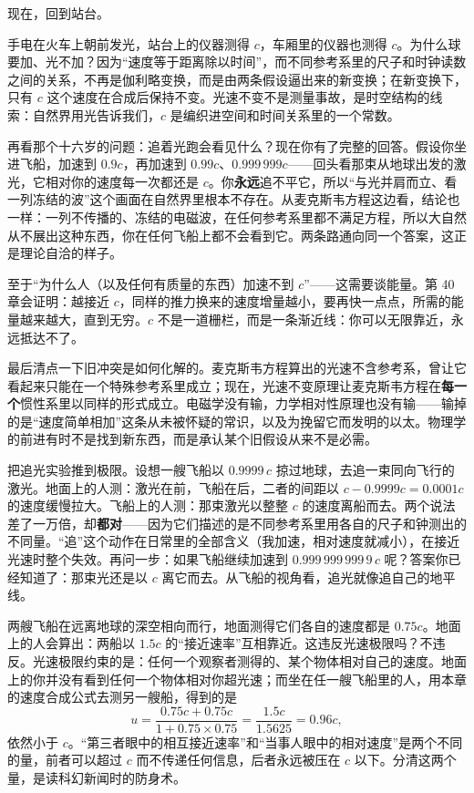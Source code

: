 
现在，回到站台。

手电在火车上朝前发光，站台上的仪器测得 \(c\)，车厢里的仪器也测得 \(c\)。为什么球要加、光不加？因为“速度等于距离除以时间”，而不同参考系里的尺子和时钟读数之间的关系，不再是伽利略变换，而是由两条假设逼出来的新变换；在新变换下，只有 \(c\) 这个速度在合成后保持不变。光速不变不是测量事故，是时空结构的线索：自然界用光告诉我们，\(c\) 是编织进空间和时间关系里的一个常数。

再看那个十六岁的问题：追着光跑会看见什么？现在你有了完整的回答。假设你坐进飞船，加速到 \(0.9c\)，再加速到 \(0.99c\)、\(0.999\,999c\)——回头看那束从地球出发的激光，它相对你的速度每一次都还是 \(c\)。你\textbf{永远}追不平它，所以“与光并肩而立、看一列冻结的波”这个画面在自然界里根本不存在。从麦克斯韦方程这边看，结论也一样：一列不传播的、冻结的电磁波，在任何参考系里都不满足方程，所以大自然从不展出这种东西，你在任何飞船上都不会看到它。两条路通向同一个答案，这正是理论自洽的样子。

至于“为什么人（以及任何有质量的东西）加速不到 \(c\)”——这需要谈能量。第 40 章会证明：越接近 \(c\)，同样的推力换来的速度增量越小，要再快一点点，所需的能量越来越大，直到无穷。\(c\) 不是一道栅栏，而是一条渐近线：你可以无限靠近，永远抵达不了。

最后清点一下旧冲突是如何化解的。麦克斯韦方程算出的光速不含参考系，曾让它看起来只能在一个特殊参考系里成立；现在，光速不变原理让麦克斯韦方程在\textbf{每一个}惯性系里以同样的形式成立。电磁学没有输，力学相对性原理也没有输——输掉的是“速度简单相加”这条从未被怀疑的常识，以及为挽留它而发明的以太。物理学的前进有时不是找到新东西，而是承认某个旧假设从来不是必需。


\begin{thought}[星系尺度的追光]
把追光实验推到极限。设想一艘飞船以 \(0.9999\,c\) 掠过地球，去追一束同向飞行的激光。地面上的人测：激光在前，飞船在后，二者的间距以 \(c-0.9999c=0.0001c\) 的速度缓慢拉大。飞船上的人测：那束激光以整整 \(c\) 的速度离船而去。两个说法差了一万倍，却\textbf{都对}——因为它们描述的是不同参考系里用各自的尺子和钟测出的不同量。“追”这个动作在日常里的全部含义（我加速，相对速度就减小），在接近光速时整个失效。再问一步：如果飞船继续加速到 \(0.999\,999\,999\,9\,c\) 呢？答案你已经知道了：那束光还是以 \(c\) 离它而去。从飞船的视角看，追光就像追自己的地平线。
\end{thought}

\begin{thought}[两台对开的飞船]
两艘飞船在远离地球的深空相向而行，地面测得它们各自的速度都是 \(0.75c\)。地面上的人会算出：两船以 \(1.5c\) 的“接近速率”互相靠近。这违反光速极限吗？不违反。光速极限约束的是：任何一个观察者测得的、某个物体相对自己的速度。地面上的你并没有看到任何一个物体相对你超光速；而坐在任一艘飞船里的人，用本章的速度合成公式去测另一艘船，得到的是
\[
u=\frac{0.75c+0.75c}{1+0.75\times0.75}=\frac{1.5c}{1.5625}=0.96c,
\]
依然小于 \(c\)。“第三者眼中的相互接近速率”和“当事人眼中的相对速度”是两个不同的量，前者可以超过 \(c\) 而不传递任何信息，后者永远被压在 \(c\) 以下。分清这两个量，是读科幻新闻时的防身术。
\end{thought}

